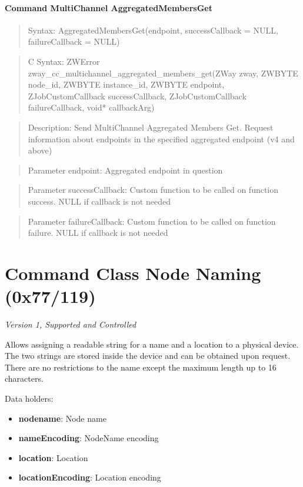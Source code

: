 \paragraph{Command MultiChannel AggregatedMembersGet}
\begin{quote}Syntax: AggregatedMembersGet(endpoint, successCallback = NULL, failureCallback = NULL)\end{quote}
\begin{quote}C Syntax: ZWError zway\_cc\_multichannel\_aggregated\_members\_get(ZWay zway, ZWBYTE node\_id, ZWBYTE instance\_id, ZWBYTE endpoint, ZJobCustomCallback successCallback, ZJobCustomCallback failureCallback, void* callbackArg)\end{quote}
\begin{quote}Description: Send MultiChannel Aggregated Members Get. Request information about endpoints in the specified aggregated endpoint (v4 and above)\end{quote}
\begin{quote}Parameter endpoint: Aggregated endpoint in question\end{quote}
\begin{quote}Parameter successCallback: Custom function to be called on function success. NULL if callback is not needed\end{quote}
\begin{quote}Parameter failureCallback: Custom function to be called on function failure. NULL if callback is not needed\end{quote}



\section{Command Class Node Naming (0x77/119)}

\textit{Version 1, Supported and Controlled}
\newline

Allows assigning a readable string for a name and a location to a physical device. The two strings are stored inside the device and can be obtained upon request. There are no restrictions to the name except the maximum length up to 16 characters.
\newline

\noindent
Data holders:

\begin{itemize}
\item \textbf{nodename}: Node name
\item \textbf{nameEncoding}: NodeName encoding
\item \textbf{location}: Location
\item \textbf{locationEncoding}: Location encoding
\end{itemize}

